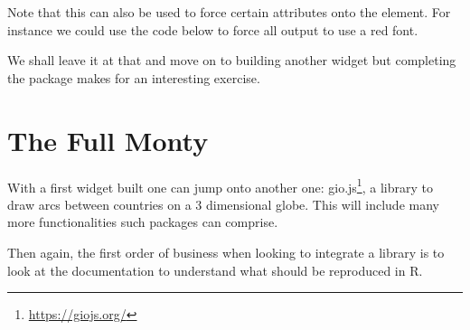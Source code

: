 \documentclass[
]{krantz}
\makeatletter
\newenvironment{Shaded}{\begin{snugshade}}{\end{snugshade}}
\newcommand{\ControlFlowTok}[1]{\textcolor[rgb]{0.27,0.27,0.27}{\textbf{#1}}}
\newcommand{\DataTypeTok}[1]{\textcolor[rgb]{0.27,0.27,0.27}{#1}}
\newcommand{\KeywordTok}[1]{\textcolor[rgb]{0.27,0.27,0.27}{\textbf{#1}}}
\newcommand{\NormalTok}[1]{#1}
\newcommand{\OperatorTok}[1]{\textcolor[rgb]{0.43,0.43,0.43}{\textbf{#1}}}
\newcommand{\StringTok}[1]{\textcolor[rgb]{0.5,0.5,0.5}{#1}}
\renewcommand{\href}[2]{#2\footnote{\url{#1}}}
\newenvironment{kframe}{%
\medskip{}
\setlength{\fboxsep}{.8em}
 \def\at@end@of@kframe{}%
 \ifinner\ifhmode%
  \def\at@end@of@kframe{\end{minipage}}%
  \begin{minipage}{\columnwidth}%
 \fi\fi%
 \def\FrameCommand##1{\hskip\@totalleftmargin \hskip-\fboxsep
 \colorbox{shadecolor}{##1}\hskip-\fboxsep
     \hskip-\linewidth \hskip-\@totalleftmargin \hskip\columnwidth}%
 \MakeFramed {\advance\hsize-\width
   \@totalleftmargin\z@ \linewidth\hsize
   \@setminipage}}%
 {\par\unskip\endMakeFramed%
 \at@end@of@kframe}
\renewenvironment{Shaded}{\begin{kframe}}{\end{kframe}}
\makeatother
\begin{document}
\begin{Shaded}
\end{Shaded}

Note that this can also be used to force certain attributes onto the element. For instance we could use the code below to force all output to use a red font.

\begin{Shaded}
\end{Shaded}

We shall leave it at that and move on to building another widget but completing the package makes for an interesting exercise.

\hypertarget{the-full-monty}{%
\chapter{The Full Monty}\label{the-full-monty}}

With a first widget built one can jump onto another one: \href{https://giojs.org/}{gio.js}, a library to draw arcs between countries on a 3 dimensional globe. This will include many more functionalities such packages can comprise.

Then again, the first order of business when looking to integrate a library is to look at the documentation to understand what should be reproduced in R.
\end{document}
